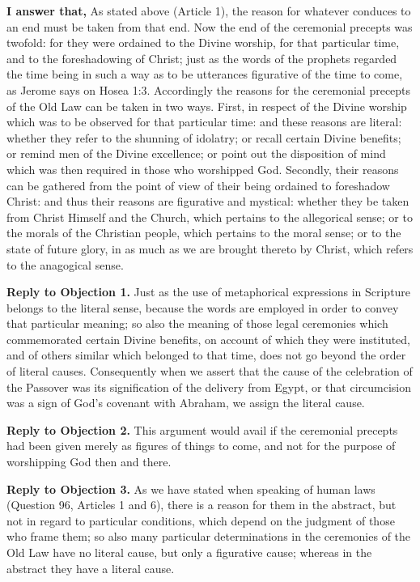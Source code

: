 \textbf{I answer that,} As stated above (Article 1), the reason for whatever conduces to an end must be taken from that end. Now the end of the ceremonial precepts was twofold: for they were ordained to the Divine worship, for that particular time, and to the foreshadowing of Christ; just as the words of the prophets regarded the time being in such a way as to be utterances figurative of the time to come, as Jerome says on Hosea 1:3. Accordingly the reasons for the ceremonial precepts of the Old Law can be taken in two ways. First, in respect of the Divine worship which was to be observed for that particular time: and these reasons are literal: whether they refer to the shunning of idolatry; or recall certain Divine benefits; or remind men of the Divine excellence; or point out the disposition of mind which was then required in those who worshipped God. Secondly, their reasons can be gathered from the point of view of their being ordained to foreshadow Christ: and thus their reasons are figurative and mystical: whether they be taken from Christ Himself and the Church, which pertains to the allegorical sense; or to the morals of the Christian people, which pertains to the moral sense; or to the state of future glory, in as much as we are brought thereto by Christ, which refers to the anagogical sense.

\textbf{Reply to Objection 1.} Just as the use of metaphorical expressions in Scripture belongs to the literal sense, because the words are employed in order to convey that particular meaning; so also the meaning of those legal ceremonies which commemorated certain Divine benefits, on account of which they were instituted, and of others similar which belonged to that time, does not go beyond the order of literal causes. Consequently when we assert that the cause of the celebration of the Passover was its signification of the delivery from Egypt, or that circumcision was a sign of God's covenant with Abraham, we assign the literal cause.

\textbf{Reply to Objection 2.} This argument would avail if the ceremonial precepts had been given merely as figures of things to come, and not for the purpose of worshipping God then and there.

\textbf{Reply to Objection 3.} As we have stated when speaking of human laws (Question 96, Articles 1 and 6), there is a reason for them in the abstract, but not in regard to particular conditions, which depend on the judgment of those who frame them; so also many particular determinations in the ceremonies of the Old Law have no literal cause, but only a figurative cause; whereas in the abstract they have a literal cause.

